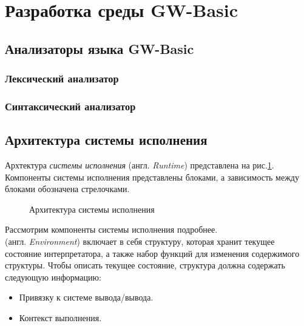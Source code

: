 \documentclass[12pt]{article}
\begin{document}
	\newpage
	\section{Разработка среды GW-Basic}
		\subsection{Анализаторы языка GW-Basic}
			\subsubsection{Лексический анализатор}
			\label{subsec:lexAnalyzer}
			\subsubsection{Синтаксический анализатор}
			\label{subsec:syntaxAnalyzer}
				
				
		\subsection{Архитектура системы исполнения}
			\label{subsec:runtimeArch}
			\hspace{\parindent} Архтектура {\it системы исполнения} (англ. {\it Runtime}) представлена на рис.\ref{fig:runtimeArch}. Компоненты системы исполнения представлены блоками, а зависимость между блоками обозначена стрелочками. 	
			\begin{figure}[h]
				\caption{Архитектура системы исполнения}
				\label{fig:runtimeArch}
			\end{figure}
			
			\indent Рассмотрим компоненты системы исполнения подробнее. \\
			 (англ. {\it Environment}) включает в себя структуру, которая хранит текущее состояние интерпретатора, а также набор функций для изменения содержимого структуры. Чтобы описать текущее состояние, структура должна содержать следующую информацию:
			\begin{itemize}
				\item Привязку к системе вывода/вывода.
				\item Контекст выполнения.
			\end{itemize}
				
\end{document}
